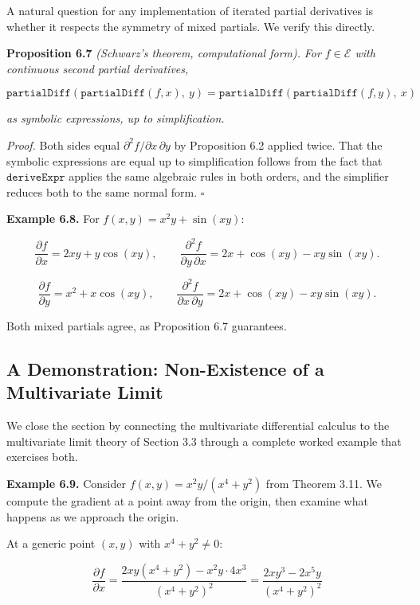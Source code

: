 \documentclass[12pt]{article}
\begin{document}
A natural question for any implementation of iterated partial
derivatives is whether it respects the symmetry of mixed partials. We
verify this directly.

\textbf{Proposition 6.7} \emph{(Schwarz's theorem, computational form).}
\emph{For \(f \in \mathcal{E}\) with continuous second partial
derivatives,}

\[\mathtt{partialDiff}(\mathtt{partialDiff}(f, x),\ y) = \mathtt{partialDiff}(\mathtt{partialDiff}(f, y),\ x)\]

\emph{as symbolic expressions, up to simplification.}

\emph{Proof.} Both sides equal
\(\partial^2 f / \partial x \, \partial y\) by Proposition 6.2 applied
twice. That the symbolic expressions are equal up to simplification
follows from the fact that \(\mathtt{deriveExpr}\) applies the same
algebraic rules in both orders, and the simplifier reduces both to the
same normal form. \(\square\)

\textbf{Example 6.8.} For \(f(x,y) = x^2 y + \sin(xy)\):

\[\frac{\partial f}{\partial x} = 2xy + y\cos(xy), \qquad \frac{\partial^2 f}{\partial y \, \partial x} = 2x + \cos(xy) - xy\sin(xy).\]

\[\frac{\partial f}{\partial y} = x^2 + x\cos(xy), \qquad \frac{\partial^2 f}{\partial x \, \partial y} = 2x + \cos(xy) - xy\sin(xy).\]

Both mixed partials agree, as Proposition 6.7 guarantees.




\subsection{A Demonstration: Non-Existence of a Multivariate
Limit}\label{a-demonstration-non-existence-of-a-multivariate-limit}

We close the section by connecting the multivariate differential
calculus to the multivariate limit theory of Section 3.3 through a
complete worked example that exercises both.

\textbf{Example 6.9.} Consider \(f(x,y) = x^2 y / (x^4 + y^2)\) from
Theorem 3.11. We compute the gradient at a point away from the origin,
then examine what happens as we approach the origin.

At a generic point \((x, y)\) with \(x^4 + y^2 \neq 0\):

\[\frac{\partial f}{\partial x} = \frac{2xy(x^4+y^2) - x^2y \cdot 4x^3}{(x^4+y^2)^2} = \frac{2xy^3 - 2x^5y}{(x^4+y^2)^2}\]
\end{document}
